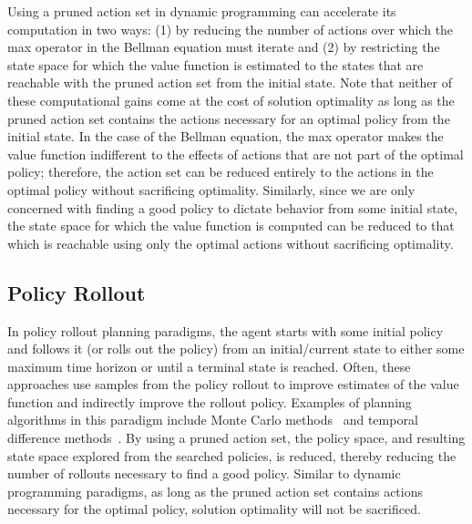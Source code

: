 \documentclass[]{article}
\newcommand{\stnote}[1]{\textcolor{Blue}{\textbf{ST: #1}}}
\newcommand{\dgnote}[1]{\textcolor{Orange}{\textbf{DG: #1}}}
\begin{document}
Using a pruned action set in dynamic programming can accelerate its
computation in two ways: (1) by reducing the number of actions over
which the max operator in the Bellman equation must iterate and (2) by
restricting the state space for which the value function is estimated
to the states that are reachable with the pruned action set from the
initial state. Note that neither of these computational gains come at
the cost of solution optimality as long as the pruned action set
contains the actions necessary for an optimal policy from the initial
state. In the case of the Bellman equation, the max operator makes the
value function indifferent to the effects of actions that are not part
of the optimal policy; therefore, the action set can be reduced
entirely to the actions in the optimal policy without sacrificing
optimality. Similarly, since we are only concerned with finding a good
policy to dictate behavior from some initial state, the state space
for which the value function is computed can be reduced to that which
is reachable using only the optimal actions without sacrificing
optimality.  

\subsection{Policy Rollout}

In policy rollout planning paradigms, the agent starts with some
initial policy and follows it (or rolls out the policy) from an
initial/current state to either some maximum time horizon or until a
terminal state is reached. Often, these approaches use samples from
the policy rollout to improve estimates of the value function and
indirectly improve the rollout policy. Examples of planning algorithms
in this paradigm include Monte Carlo methods~\citep{browne12,
  silver10} and temporal difference
methods~\citep{sutton99,sutton1988lpm,rummery1994line,6313077,lagoudakis2003least,Peters:2008ve}.
By using a pruned
action set, the policy space, and resulting state space explored from
the searched policies, is reduced, thereby reducing the number of
rollouts necessary to find a good policy. Similar to dynamic
programming paradigms, as long as the pruned action set contains
actions necessary for the optimal policy, solution optimality will not
be sacrificed.
\end{document}
